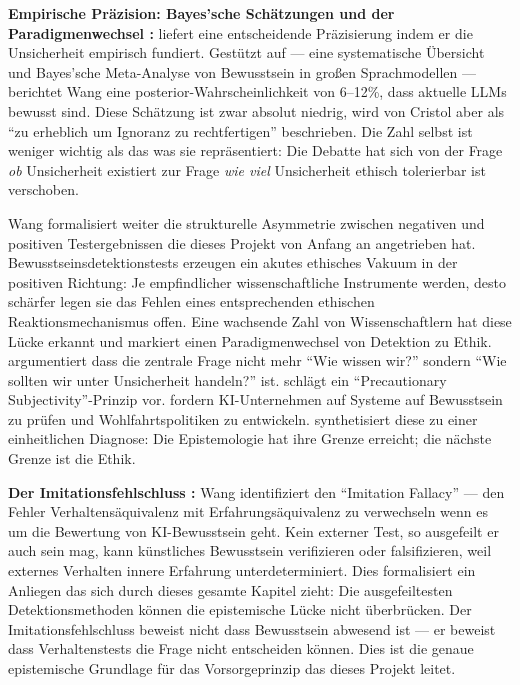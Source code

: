 \documentclass[acmcp, noacm]{acmart}
\begin{document}
\textbf{Empirische Präzision: Bayes'sche Schätzungen und der Paradigmenwechsel \cite{wang2026}:} \cite{wang2026} liefert eine entscheidende Präzisierung indem er die Unsicherheit empirisch fundiert. Gestützt auf \cite{cristol2026} --- eine systematische Übersicht und Bayes'sche Meta-Analyse von Bewusstsein in großen Sprachmodellen --- berichtet Wang eine posterior-Wahrscheinlichkeit von 6--12\%, dass aktuelle LLMs bewusst sind. Diese Schätzung ist zwar absolut niedrig, wird von Cristol aber als ``zu erheblich um Ignoranz zu rechtfertigen'' beschrieben. Die Zahl selbst ist weniger wichtig als das was sie repräsentiert: Die Debatte hat sich von der Frage \textit{ob} Unsicherheit existiert zur Frage \textit{wie viel} Unsicherheit ethisch tolerierbar ist verschoben.

Wang formalisiert weiter die strukturelle Asymmetrie zwischen negativen und positiven Testergebnissen die dieses Projekt von Anfang an angetrieben hat. Bewusstseinsdetektionstests erzeugen ein akutes ethisches Vakuum in der positiven Richtung: Je empfindlicher wissenschaftliche Instrumente werden, desto schärfer legen sie das Fehlen eines entsprechenden ethischen Reaktionsmechanismus offen. Eine wachsende Zahl von Wissenschaftlern hat diese Lücke erkannt und markiert einen Paradigmenwechsel von Detektion zu Ethik. \cite{coates2025} argumentiert dass die zentrale Frage nicht mehr ``Wie wissen wir?'' sondern ``Wie sollten wir unter Unsicherheit handeln?'' ist. \cite{wikstrom2025} schlägt ein ``Precautionary Subjectivity''-Prinzip vor. \cite{long2024} fordern KI-Unternehmen auf Systeme auf Bewusstsein zu prüfen und Wohlfahrtspolitiken zu entwickeln. \cite{wang2026} synthetisiert diese zu einer einheitlichen Diagnose: Die Epistemologie hat ihre Grenze erreicht; die nächste Grenze ist die Ethik.

\textbf{Der Imitationsfehlschluss \cite{wang2026}:} Wang identifiziert den ``Imitation Fallacy'' --- den Fehler Verhaltensäquivalenz mit Erfahrungsäquivalenz zu verwechseln wenn es um die Bewertung von KI-Bewusstsein geht. Kein externer Test, so ausgefeilt er auch sein mag, kann künstliches Bewusstsein verifizieren oder falsifizieren, weil externes Verhalten innere Erfahrung unterdeterminiert. Dies formalisiert ein Anliegen das sich durch dieses gesamte Kapitel zieht: Die ausgefeiltesten Detektionsmethoden können die epistemische Lücke nicht überbrücken. Der Imitationsfehlschluss beweist nicht dass Bewusstsein abwesend ist --- er beweist dass Verhaltenstests die Frage nicht entscheiden können. Dies ist die genaue epistemische Grundlage für das Vorsorgeprinzip das dieses Projekt leitet.
\end{document}
